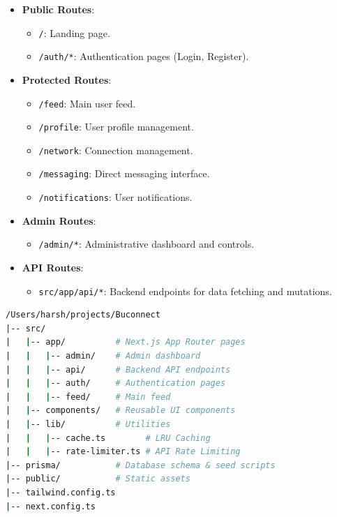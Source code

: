 \documentclass{article}
\begin{document}
\begin{itemize}
    \item \textbf{Public Routes}:
    \begin{itemize}
        \item \texttt{/}: Landing page.
        \item \texttt{/auth/*}: Authentication pages (Login, Register).
    \end{itemize}
    \item \textbf{Protected Routes}:
    \begin{itemize}
        \item \texttt{/feed}: Main user feed.
        \item \texttt{/profile}: User profile management.
        \item \texttt{/network}: Connection management.
        \item \texttt{/messaging}: Direct messaging interface.
        \item \texttt{/notifications}: User notifications.
    \end{itemize}
    \item \textbf{Admin Routes}:
    \begin{itemize}
        \item \texttt{/admin/*}: Administrative dashboard and controls.
    \end{itemize}
    \item \textbf{API Routes}:
    \begin{itemize}
        \item \texttt{src/app/api/*}: Backend endpoints for data fetching and mutations.
    \end{itemize}
\end{itemize}

\begin{lstlisting}[language=bash]
/Users/harsh/projects/Buconnect
|-- src/
|   |-- app/          # Next.js App Router pages
|   |   |-- admin/    # Admin dashboard
|   |   |-- api/      # Backend API endpoints
|   |   |-- auth/     # Authentication pages
|   |   |-- feed/     # Main feed
|   |-- components/   # Reusable UI components
|   |-- lib/          # Utilities
|   |   |-- cache.ts        # LRU Caching
|   |   |-- rate-limiter.ts # API Rate Limiting
|-- prisma/           # Database schema & seed scripts
|-- public/           # Static assets
|-- tailwind.config.ts
|-- next.config.ts
\end{lstlisting}
\end{document}
